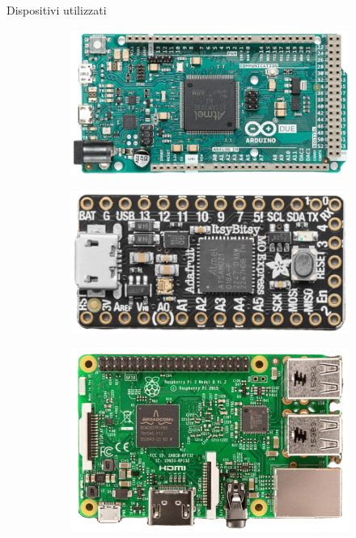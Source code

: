 
\begin{frame}{Dispositivi utilizzati}

\begin{figure}
    \centering
    \begin{subfigure}[m]{0.30\textwidth}
        \centering
        \includegraphics[height=0.49\textwidth]{images/introduction/arduino.png}
    \end{subfigure}
    \hfill \hfill \hfill
    \begin{subfigure}[m]{0.36\textwidth}
        \centering
        \includegraphics[height=0.40\textwidth]{images/introduction/adafruit.png}
    \end{subfigure}
    \hfill
    \begin{subfigure}[m]{0.30\textwidth}
    \centering
        \includegraphics[height=0.48\textwidth]{images/introduction/raspberry.png}
    \end{subfigure}
\end{figure}

\end{frame}

